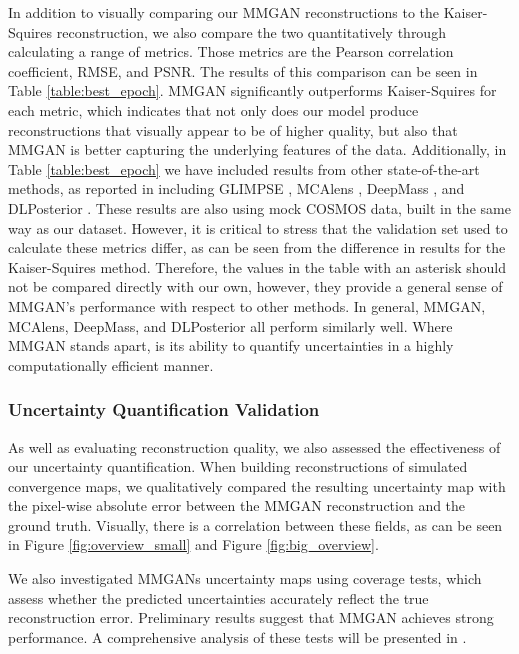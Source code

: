 \documentclass[fleqn,usenatbib]{mnras}
\begin{document}
In addition to visually comparing our MMGAN reconstructions to the Kaiser-Squires reconstruction, we also compare the two quantitatively through calculating a range of metrics. Those metrics are the Pearson correlation coefficient, RMSE, and PSNR. The results of this comparison can be seen in Table \ref{table:best_epoch}. MMGAN significantly outperforms Kaiser-Squires for each metric, which indicates that not only does our model produce reconstructions that visually appear to be of higher quality, but also that MMGAN is better capturing the underlying features of the data. Additionally, in Table \ref{table:best_epoch} we have included results from other state-of-the-art methods, as reported in \citet[\S Table 1]{remy2023probabilistic} including GLIMPSE \citep{lanusse2016high}, MCAlens \citep{starck2021weak}, DeepMass \citep{jeffrey2020deep}, and DLPosterior \citep{remy2023probabilistic}. These results are also using mock COSMOS data, built in the same way as our dataset. However, it is critical to stress that the validation set used to calculate these metrics differ, as can be seen from the difference in results for the Kaiser-Squires method. Therefore, the values in the table with an asterisk should not be compared directly with our own, however, they provide a general sense of MMGAN's performance with respect to other methods. In general, MMGAN, MCAlens, DeepMass, and DLPosterior all perform similarly well. Where MMGAN stands apart, is its ability to quantify uncertainties in a highly computationally efficient manner.

\subsubsection{Uncertainty Quantification Validation}\label{subsubsec:uq_validation}

As well as evaluating reconstruction quality, we also assessed the effectiveness of our uncertainty quantification. When building reconstructions of simulated convergence maps, we qualitatively compared the resulting uncertainty map with the pixel-wise absolute error between the MMGAN reconstruction and the ground truth. Visually, there is a correlation between these fields, as can be seen in Figure \ref{fig:overview_small} and Figure \ref{fig:big_overview}.

We also investigated MMGANs uncertainty maps using coverage tests, which assess whether the predicted uncertainties accurately reflect the true reconstruction error. Preliminary results suggest that MMGAN achieves strong performance. A comprehensive analysis of these tests will be presented in \citet{whitney2025}.
\end{document}
